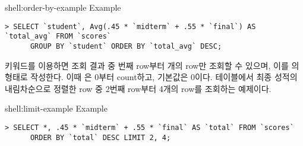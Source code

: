 \begin{shellenv}{shell:order-by-example}{ Example}\begin{verbatim}
> SELECT `student`, Avg(.45 * `midterm` + .55 * `final`) AS `total_avg` FROM `scores`
      GROUP BY `student` ORDER BY `total_avg` DESC;
\end{verbatim}
\end{shellenv}

 키워드를 이용하면 조회 결과 중 번째 row부터 개의 row만 조회할 수 있으며, 이를 의 형태로 작성한다. 이때 은 0부터 count하고, 기본값은 0이다. \은  테이블에서 최종 성적의 내림차순으로 정렬한 row 중 2번째 row부터 4개의 row를 조회하는 예제이다.

\begin{shellenv}{shell:limit-example}{ Example}\begin{verbatim}
> SELECT *, .45 * `midterm` + .55 * `final` AS `total` FROM `scores`
      ORDER BY `total` DESC LIMIT 2, 4;
\end{verbatim}
\end{shellenv}
